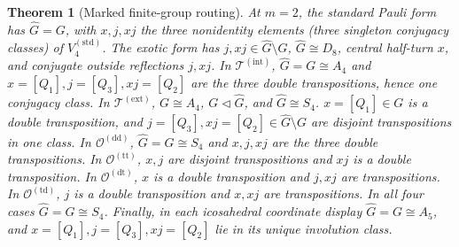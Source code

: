 \documentclass[11pt,letterpaper,onecolumn]{article}
\theoremstyle{plain}
\newtheorem{theorem}{Theorem}[section]
\theoremstyle{definition}
\theoremstyle{remark}
\newcommand{\KleinStd}{{V_4^{(\mathrm{std})}}}
\newcommand{\TetInt}{{\mathcal T^{(\mathrm{int})}}}
\newcommand{\TetExt}{{\mathcal T^{(\mathrm{ext})}}}
\newcommand{\OctDD}{{\mathcal O^{(\mathrm{dd})}}}
\newcommand{\OctTT}{{\mathcal O^{(\mathrm{tt})}}}
\newcommand{\OctDT}{{\mathcal O^{(\mathrm{dt})}}}
\newcommand{\OctTD}{{\mathcal O^{(\mathrm{td})}}}
\begin{document}
\begin{theorem}[Marked finite-group routing]
At \(m=2\), the standard Pauli form has \(\widehat G=G\), with \(x,j,xj\) the three
nonidentity elements (three singleton conjugacy classes) of \(\KleinStd\). The
exotic form has \(j,xj\in \widehat G\setminus G\), \(\widehat G\cong D_8\), central half-turn
\(x\), and conjugate outside reflections \(j,xj\).  In \(\TetInt\),
\(\widehat G=G\cong A_4\) and \(x=[Q_1],j=[Q_3],xj=[Q_2]\) are the three double
transpositions, hence one conjugacy class.  In \(\TetExt\),
\(G\cong A_4\), \(G\triangleleft \widehat G\), and \(\widehat G\cong S_4\).
\(x=[Q_1]\in G\) is a double transposition,
and \(j=[Q_3],xj=[Q_2]\in \widehat G\setminus G\) are disjoint transpositions in one
  class.  In \(\OctDD\), \(\widehat G=G\cong S_4\) and \(x,j,xj\) are the three
  double transpositions.  In \(\OctTT\), \(x,j\) are disjoint
  transpositions and \(xj\) is a double transposition.  In
  \(\OctDT\), \(x\) is a double transposition and \(j,xj\) are
  transpositions. In \(\OctTD\), \(j\) is a double transposition
  and \(x,xj\) are transpositions.  In all four cases \(\widehat G=G\cong S_4\).
  Finally, in
each icosahedral coordinate display \(\widehat G=G\cong A_5\), and
\(x=[Q_1],j=[Q_3],xj=[Q_2]\) lie in its unique involution class.
\end{theorem}
\end{document}
